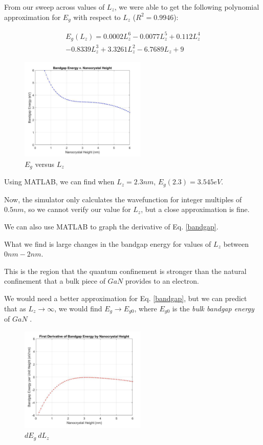 \documentclass{IEEEtran}
\begin{document}
From our sweep across values of \(L_z\), we were able to get the following polynomial approximation for \(E_g\) with respect to \(L_z\) (\(R^2 = 0.9946\)):

\begin{multline} \label{bandgap}
    E_g(L_z) = 0.0002 L_z^6 - 0.0077 L_z^5 + 0.112 L_z^4 \\ - 0.8339 L_z^3 + 3.3261 L_z^2 - 6.7689 L_z + 9
\end{multline}

\begin{figure}[!h] 
    \centering
    \includegraphics*[width = 6cm]{EgVLz.png}
    \caption{\(E_g\) versus \(L_z\)}
    \label{fig:func}
\end{figure}    

Using MATLAB, we can find when \(L_z = 2.3nm\), \(E_g(2.3) = 3.545eV\).

Now, the simulator only calculates the wavefunction for integer multiples of \(0.5nm\), so we cannot verify our value for \(L_z\), but a close approximation is fine. 


We can also use MATLAB to graph the derivative of Eq. \ref{bandgap}. 

What we find is large changes in the bandgap energy for values of \(L_z\) between \(0nm - 2nm\).

This is the region that the quantum confinement is stronger than the natural confinement that a bulk piece of \(GaN\) provides to an electron. 

We would need a better approximation for Eq. \ref{bandgap}, but we can predict that as \(L_z \to \infty\), we would find \(E_g \to E_{g0}\), where \(E_{g0}\) is the \textit{bulk bandgap energy} of \(GaN\) .



\begin{figure}[!h] 
    \centering
    \includegraphics*[width = 6cm]{derivativeOfEgVLz.png}
    \caption{\(dE_g \ dL_z\)}
    \label{fig:derivative}
\end{figure}    
\end{document}
